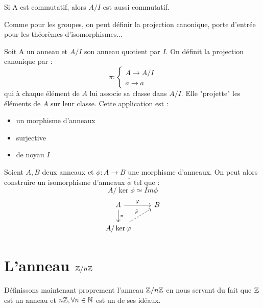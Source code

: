 \begin{proposition}
    Si A est commutatif, alors $A/I$ est aussi commutatif. 
\end{proposition}

Comme pour les groupes, on peut définir la projection canonique, porte d'entrée pour les théorèmes d'isomorphismes... 

\begin{definition}
    Soit A un anneau et $A/I$ son anneau quotient par $I$. 
    On définit la projection canonique par : 
        \[ \pi : 
            \begin{cases}
                A \longrightarrow A/I \\ 
                a \longrightarrow \overline{a} 
            \end{cases} \]
    qui à chaque élément de $A$ lui associe sa classe dans $A/I$. Elle "projette" les éléments de $A$ sur leur classe. 
    Cette application est : 
    \begin{itemize}
        \item un morphisme d'anneaux 
        \item surjective 
        \item de noyau $I$ 
    \end{itemize}
\end{definition}

\begin{theorem}[Isomorphisme]
    Soient $A,B$ deux anneaux et $\phi : A \longrightarrow B$ une morphisme d'anneaux. 
    On peut alors construire un isomorphisme d'anneaux $\overline{\phi}$ tel que : 
        \[ A / \ker \phi \simeq Im \phi \] 
    \[
        \begin{tikzcd}
            A \arrow[r, "\phi"] \arrow[d, two heads, "\pi"] & B \\
            A/\ker \phi \arrow[ur, "\tilde{\phi}", dashed] & 
        \end{tikzcd}
    \]
\end{theorem}



\section{L'anneau $\mathbb{Z} / n\mathbb{Z}$}

Définissons maintenant proprement l'anneau $\mathbb{Z} /n \mathbb{Z}$ en nous servant du fait que $\mathbb{Z}$ est un anneau 
et $ n \mathbb{Z}, \forall n \in \mathbb{N}$ est un de ses idéaux. 

